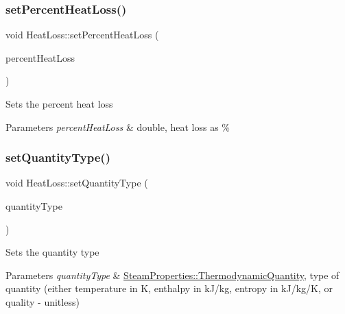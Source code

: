 \subsubsection{\texorpdfstring{set\+Percent\+Heat\+Loss()}{setPercentHeatLoss()}\hspace{0.1cm}{\footnotesize\ttfamily [3/3]}}
{\footnotesize\ttfamily void Heat\+Loss\+::set\+Percent\+Heat\+Loss (\begin{DoxyParamCaption}\item[{double}]{percent\+Heat\+Loss }\end{DoxyParamCaption})}

Sets the percent heat loss 
\begin{DoxyParams}{Parameters}
{\em percent\+Heat\+Loss} & double, heat loss as \% \\
\hline
\end{DoxyParams}
\mbox{\label{class_heat_loss_a7c125f1137f31eba8826a1aa3b905290}} 
\subsubsection{\texorpdfstring{set\+Quantity\+Type()}{setQuantityType()}\hspace{0.1cm}{\footnotesize\ttfamily [1/3]}}
{\footnotesize\ttfamily void Heat\+Loss\+::set\+Quantity\+Type (\begin{DoxyParamCaption}\item[{\hyperlink{class_steam_properties_ae0294bedf7d178c2d8fb6aed0f62fbff}{Steam\+Properties\+::\+Thermodynamic\+Quantity}}]{quantity\+Type }\end{DoxyParamCaption})}

Sets the quantity type 
\begin{DoxyParams}{Parameters}
{\em quantity\+Type} & \hyperlink{class_steam_properties_ae0294bedf7d178c2d8fb6aed0f62fbff}{Steam\+Properties\+::\+Thermodynamic\+Quantity}, type of quantity (either temperature in K, enthalpy in k\+J/kg, entropy in k\+J/kg/K, or quality -\/ unitless) \\
\hline
\end{DoxyParams}
\mbox{\label{class_heat_loss_a7c125f1137f31eba8826a1aa3b905290}} 
